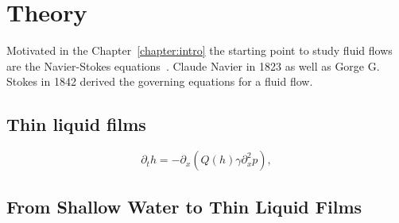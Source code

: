 \chapter{Theory}
\label{chapter:theory}
Motivated in the Chapter~\ref{chapter:intro} the starting point to study fluid flows are the Navier-Stokes equations~\cite{Navier, Stokes}.
Claude Navier in 1823 as well as Gorge G. Stokes in 1842 derived the governing equations for a fluid flow.

\section{Thin liquid films}
\label{sec:thin_films}
\begin{equation}\label{eq:simple_thin_film}
    \partial_t h = -\partial_x\left(Q(h)\gamma\partial_x^2 p\right),
\end{equation}

\section{From Shallow Water to Thin Liquid Films}
\label{sec:theory_thin_film}

